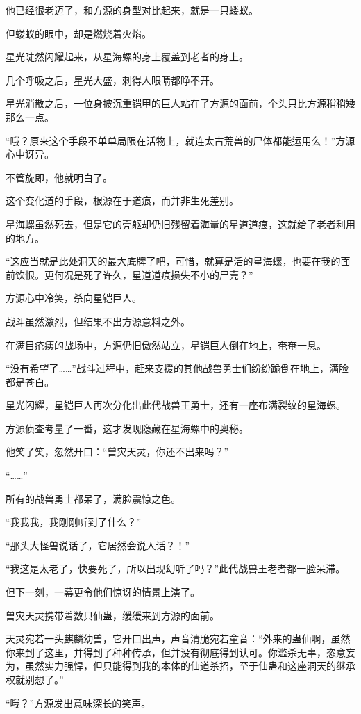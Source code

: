 \begin{this_body}
他已经很老迈了，和方源的身型对比起来，就是一只蝼蚁。

但蝼蚁的眼中，却是燃烧着火焰。

星光陡然闪耀起来，从星海螺的身上覆盖到老者的身上。

几个呼吸之后，星光大盛，刺得人眼睛都睁不开。

星光消散之后，一位身披沉重铠甲的巨人站在了方源的面前，个头只比方源稍稍矮那么一点。

“哦？原来这个手段不单单局限在活物上，就连太古荒兽的尸体都能运用么！”方源心中讶异。

不管旋即，他就明白了。

这个变化道的手段，根源在于道痕，而并非生死差别。

星海螺虽然死去，但是它的壳躯却仍旧残留着海量的星道道痕，这就给了老者利用的地方。

“这应当就是此处洞天的最大底牌了吧，可惜，就算是活的星海螺，也要在我的面前饮恨。更何况是死了许久，星道道痕损失不小的尸壳？”

方源心中冷笑，杀向星铠巨人。

战斗虽然激烈，但结果不出方源意料之外。

在满目疮痍的战场中，方源仍旧傲然站立，星铠巨人倒在地上，奄奄一息。

“没有希望了……”战斗过程中，赶来支援的其他战兽勇士们纷纷跪倒在地上，满脸都是苍白。

星光闪耀，星铠巨人再次分化出此代战兽王勇士，还有一座布满裂纹的星海螺。

方源侦查考量了一番，这才发现隐藏在星海螺中的奥秘。

他笑了笑，忽然开口：“兽灾天灵，你还不出来吗？”

“……”

所有的战兽勇士都呆了，满脸震惊之色。

“我我我，我刚刚听到了什么？”

“那头大怪兽说话了，它居然会说人话？！”

“我这是太老了，快要死了，所以出现幻听了吗？”此代战兽王老者都一脸呆滞。

但下一刻，一幕更令他们惊讶的情景上演了。

兽灾天灵携带着数只仙蛊，缓缓来到方源的面前。

天灵宛若一头麒麟幼兽，它开口出声，声音清脆宛若童音：“外来的蛊仙啊，虽然你来到了这里，并得到了种种传承，但并没有彻底得到认可。你滥杀无辜，恣意妄为，虽然实力强悍，但只能得到我的本体的仙道杀招，至于仙蛊和这座洞天的继承权就别想了。”

“哦？”方源发出意味深长的笑声。


\end{this_body}
